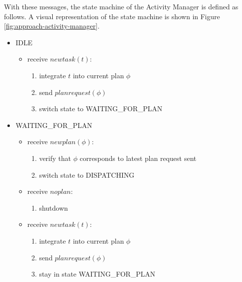 With these messages, the state machine of the Activity Manager is defined as follows.
A visual representation of the state machine is shown in Figure \ref{fig:approach-activity-manager}.

\begin{itemize}
    \item IDLE
    \begin{itemize}
        \item receive $newtask(t)$:
        \begin{enumerate}
            \item integrate $t$ into current plan $\phi$
            \item send $planrequest(\phi)$
            \item switch state to WAITING\_FOR\_PLAN
        \end{enumerate}
    \end{itemize}
    \item WAITING\_FOR\_PLAN
    \begin{itemize}
        \item receive $newplan(\phi)$:
        \begin{enumerate}
            \item verify that $\phi$ corresponds to latest plan request sent
            \item switch state to DISPATCHING
        \end{enumerate}
        \item receive $noplan$:
        \begin{enumerate}
            \item shutdown
        \end{enumerate}
        \item receive $newtask(t)$:
        \begin{enumerate}
            \item integrate $t$ into current plan $\phi$
            \item send $planrequest(\phi)$
            \item stay in state WAITING\_FOR\_PLAN
        \end{enumerate}

\end{itemize}
\end{itemize}
